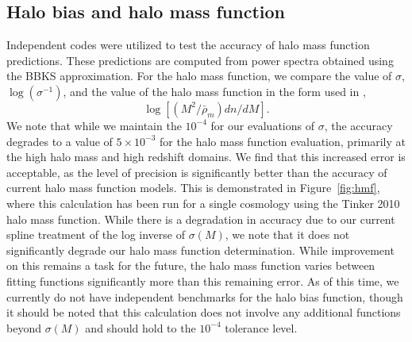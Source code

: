 \documentclass[\docopts]{\docclass}
\begin{document}
\subsection{Halo bias and halo mass function}

Independent codes were utilized to test the accuracy of halo mass function predictions. These predictions are computed from power spectra obtained using the BBKS approximation. For the halo mass function, we compare the value of $\sigma$, $\log(\sigma^{-1})$, and the value of the halo mass function in the form used in \cite{Tinker2008},
\begin{equation}
\log[(M^2/\bar{\rho}_m)dn/dM].
\end{equation}
We note that while we maintain the $10^{-4}$ for our evaluations of $\sigma$, the accuracy degrades to a value of $5\times10^{-3}$ for the halo mass function evaluation, primarily at the high halo mass and high redshift domains. We find that this increased error is acceptable, as the level of precision is significantly better than the accuracy of current halo mass function models. This is demonstrated in Figure~\ref{fig:hmf}, where this calculation has been run for a single cosmology using the Tinker 2010 halo mass function. While there is a degradation in accuracy due to our current spline treatment of the log inverse of $\sigma(M)$, we note that it does not significantly degrade our halo mass function determination. While improvement on this remains a task for the future, the halo mass function varies between fitting functions significantly more than this remaining error. As of this time, we currently do not have independent benchmarks for the halo bias function, though it should be noted that this calculation does not involve any additional functions beyond $\sigma(M)$ and should hold to the $10^{-4}$ tolerance level.
\end{document}
